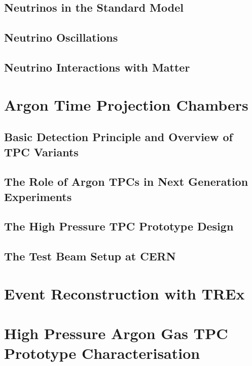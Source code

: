 \documentclass[a4paper, 11pt]{report}
\begin{document}
\section{Neutrinos in the Standard Model}


\section{Neutrino Oscillations}


\section{Neutrino Interactions with Matter}


\chapter{Argon Time Projection Chambers}
\section{Basic Detection Principle and Overview of TPC Variants}


\section{The Role of Argon TPCs in Next Generation Experiments}


\section{The High Pressure TPC Prototype Design}


\section{The Test Beam Setup at CERN}


\chapter{Event Reconstruction with TREx}



\chapter{High Pressure Argon Gas TPC Prototype Characterisation}
\end{document}

